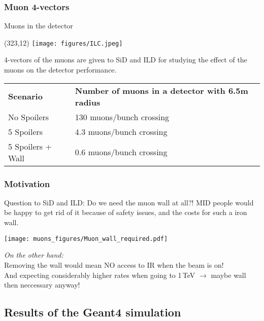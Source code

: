 \documentclass[xcolor={dvipsnames}]{beamer}
\newcommand{\ilclogo}{
  \setlength{\TPHorizModule}{1pt}
  \setlength{\TPVertModule}{1pt}
  \begin{textblock}{1}(323,12)
   \texttt{[image: figures/ILC.jpeg]}
  \end{textblock}
}
\begin{document}
\subsubsection{Muon 4-vectors}
\begin{frame}{Muons in the detector}
\ilclogo
4-vectors of the muons are given to SiD and ILD for studying the effect of the muons on the detector performance.\\
\vspace*{0.2cm}
\begin{tabular}{ll}
\textbf{Scenario} & \textbf{Number of muons in a detector with 6.5m radius}\\
 No Spoilers & 130 muons/bunch crossing\\
 5 Spoilers& 4.3 muons/bunch crossing\\
 5 Spoilers + Wall & 0.6 muons/bunch crossing
\end{tabular}
\end{frame}

\subsubsection{Motivation}
\begin{frame}{}
Question to SiD and ILD: Do we need the muon wall at all?!
MID people would be happy to get rid of it because of safety issues, and the costs for such a iron wall.
\begin{center}
\texttt{[image: muons\_figures/Muon\_wall\_required.pdf]}
\end{center}
\textit{On the other hand:}\\
\alert{Removing the wall would mean NO access to IR when the beam is on!\\
And expecting considerably higher rates when going to 1\,TeV $\rightarrow$ maybe wall then neccessary anyway!}
\end{frame}

\subsection{Results of the Geant4 simulation}
\end{document}
